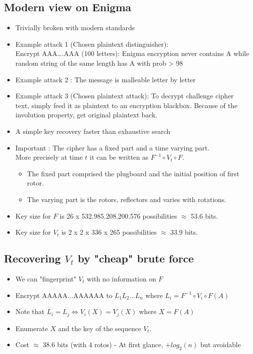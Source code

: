        	\subsection{Modern view on Enigma}
       		\begin{itemize}
       			\item Trivially broken with modern standards
       			\item Example attack 1 (Chosen plaintext distinguisher):\\
       			Encrypt AAA….AAA (100 letters): 
       			Enigma encryption never contains A while random string of the same length has A with prob > 98%
       			\item Example attack 2 : The message is malleable letter by letter
       			\item Example attack 3 (Chosen plaintext attack): 
       			To decrypt challenge cipher text, simply feed it as plaintext to an encryption blackbox. 
       			Because of the involution property, get original plaintext back.
       			\item A simple key recovery faster than exhaustive search
       			\item Important : The cipher has a fixed part and a time varying part.\\
       			More precisely at time $t$ it can be written as $F^{-1} \circ V_t \circ F$.
       			\begin{itemize}
       				\item The fixed part comprised the plugboard and the initial position of first rotor.
       				\item The varying part is the rotors, reflectors and varies with rotations.
       			\end{itemize}
       			\item Key size for $F$ is 26 x 532.985.208.200.576 possibilities $\approx$ 53.6 bits.
       			\item Key size for $V_t$ is 2 x 2 x 336 x 265 possibilities $\approx$ 33.9 bits.
       		\end{itemize}
       	
       	\subsection{Recovering $V_t$ by "cheap" brute force}
       		\begin{itemize}
       			\item We can "fingerprint" $V_t$ with no information on $F$
       			\item Encrypt AAAAA...AAAAAA to $L_1L_2...L_n$ where $L_i = F^{-1} \circ V_i \circ F(A)$
       			\item Note that $L_i = L_j \Leftrightarrow V_i(X)=V_j(X)$ where $X = F(A)$
       			\item Enumerate $X$ and the key of the sequence $V_t$.
       			\item Cost $\approx$ 38.6 bits (with 4 rotos) - At first glance, $+ log_2(n)$ but avoidable
       		\end{itemize}
       	
